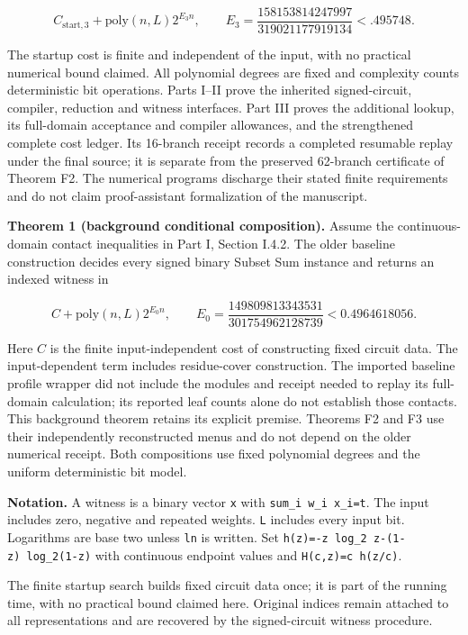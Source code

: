 \[
C_{\mathrm{start},3}+\mathrm{poly}(n,L)2^{E_3n},\qquad
E_3=\frac{158153814247997}{319021177919134}<.495748.
\]

The startup cost is finite and independent of the input, with no practical numerical bound claimed. All polynomial degrees are fixed and complexity counts deterministic bit operations. Parts I--II prove the inherited signed-circuit, compiler, reduction and witness interfaces. Part III proves the additional lookup, its full-domain acceptance and compiler allowances, and the strengthened complete cost ledger. Its 16-branch receipt records a completed resumable replay under the final source; it is separate from the preserved 62-branch certificate of Theorem F2. The numerical programs discharge their stated finite requirements and do not claim proof-assistant formalization of the manuscript.

\textbf{Theorem 1 (background conditional composition).} Assume the continuous-domain contact inequalities in Part I, Section I.4.2. The older baseline construction decides every signed binary Subset Sum instance and returns an indexed witness in

\[
C+\mathrm{poly}(n,L)2^{E_0n},
\qquad E_0=\frac{149809813343531}{301754962128739}<0.4964618056.
\]

Here \(C\) is the finite input-independent cost of constructing fixed circuit data. The input-dependent term includes residue-cover construction. The imported baseline profile wrapper did not include the modules and receipt needed to replay its full-domain calculation; its reported leaf counts alone do not establish those contacts. This background theorem retains its explicit premise. Theorems F2 and F3 use their independently reconstructed menus and do not depend on the older numerical receipt. Both compositions use fixed polynomial degrees and the uniform deterministic bit model.

\textbf{Notation.} A witness is a binary vector \texttt{x} with \texttt{sum\_i\ w\_i\ x\_i=t}. The input includes zero, negative and repeated weights. \texttt{L} includes every input bit. Logarithms are base two unless \texttt{ln} is written. Set \texttt{h(z)=-z\ log\_2\ z-(1-z)\ log\_2(1-z)} with continuous endpoint values and \texttt{H(c,z)=c\ h(z/c)}.

The finite startup search builds fixed circuit data once; it is part of the running time, with no practical bound claimed here. Original indices remain attached to all representations and are recovered by the signed-circuit witness procedure.

